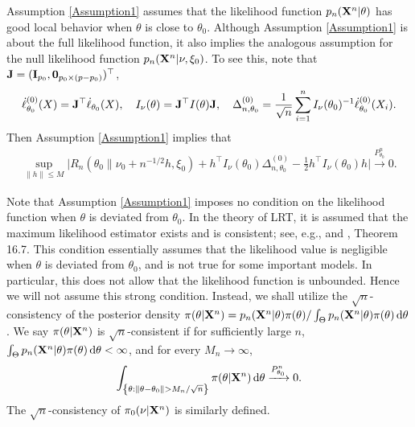 \documentclass[11pt]{article}
\theoremstyle{plain}
\theoremstyle{definition}
\theoremstyle{remark}
\begin{document}
Assumption \ref{Assumption1} assumes that the likelihood function $p_n (\mathbf{X}^n | \theta)$ has good local behavior when $\theta$ is close to $\theta_0$.
Although Assumption \ref{Assumption1} is about the full likelihood function, it also implies the analogous assumption for the null likelihood function $p_n (\mathbf{X}^n |\nu, \xi_0)$.
To see this, note that
$\mathbf{J}=(\mathbf{I}_{p_0},\mathbf{0}_{p_0\times(p-p_0)})^\top $,
$$
\dot{\ell}_{\theta_0}^{(0)}(X)= \mathbf{J}^\top \dot \ell_{\theta_0}(X)
,
\quad 
I_\nu(\theta)=\mathbf{J}^\top I(\theta) \mathbf{J},\quad 
\Delta_{n,\theta_0}^{(0)}
=\frac{1}{\sqrt{n}}\sum_{i=1}^n I_\nu(\theta_0)^{-1}\dot{\ell}^{(0)}_{\theta_0}(X_i)
.
$$
Then  Assumption \ref{Assumption1} implies that
\begin{align*}
        \sup_{\|h\|\leq M}\Big|
        R_n( \theta_0\|\nu_0 + n^{-1/2 }h, \xi_0 )
        +h^\top  I_{\nu}(\theta_0)\Delta_{n,\theta_0}^{(0)}-\frac{1}{2}h^\top  I_\nu (\theta_0) h
        \Big|\xrightarrow{P^n_{\theta_0}}0.
\end{align*}


Note that Assumption \ref{Assumption1} imposes no condition on the likelihood function when $\theta$ is deviated from $\theta_0$.
In the theory of LRT, it is assumed that the maximum likelihood estimator exists and is consistent; see, e.g., \cite{Wilks1938The} and \cite{van2000asymptotic}, Theorem 16.7.
This condition essentially assumes that the likelihood value is negligible when $\theta$ is deviated from $\theta_0$, and is not true for some important models.
In particular, this does not allow that the likelihood function is unbounded.
Hence we will not assume this strong condition.
Instead, we shall utilize the $\sqrt n$-consistency of the posterior density $\pi(\theta | \mathbf{X}^n) = p_n (\mathbf{X}^n | \theta) \pi (\theta ) / \int_{\Theta} p_n (\mathbf{X}^n | \theta) \pi (\theta) \, \mathrm d \theta $.
We say $\pi(\theta | \mathbf{X}^n)$ is $\sqrt n$-consistent if for sufficiently large $n$, $\int_{\Theta} p_n (\mathbf{X}^n | \theta) \pi (\theta) \, \mathrm d \theta < \infty$, and for every $M_n \to \infty$,
\begin{align*}
\int_{ \left\{ \theta: \|\theta - \theta_0\| > M_n / \sqrt n \right\}}\pi(\theta | \mathbf{X}^n) \, \mathrm d \theta \xrightarrow{P_{\theta_0}^n} 0.
\end{align*}
    The $\sqrt{n}$-consistency of $\pi_0(\nu | \mathbf{X}^{n})$ is similarly defined.
\end{document}
